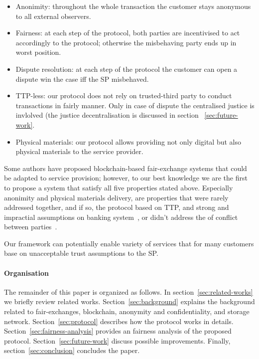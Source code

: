 \documentclass{ieeeaccess}
\begin{document}
\begin{itemize}
\item Anonimity:
throughout the whole transaction the customer stays anonymous to all external observers.
\item Fairness:
at each step of the protocol, both parties are incentivised to act accordingly to the protocol; otherwise the misbehaving party ends up in worst position.
\item Dispute resolution: at each step of the protocol the customer can open a dispute win the case iff the SP misbehaved.
\item TTP-less: 
our protocol does not rely on trusted-third party to conduct transactions in fairly manner. Only in case of dispute the centralised justice is invlolved (the justice decentralisation is discussed in section ~\ref{sec:future-work}.
\item Physical materials: our protocol allows providing not only digital but also physical materials to the service provider.
\end{itemize}

Some authors have proposed blockchain-based fair-exchange systems that could be adapted to service provision; however, to our best knowledge we
are the first to propose a system that satisfy all five properties
stated above. Especially anonimity and physical materials delivery, are
properties that were rarely addressed together, and if so, the protocol
based on TTP, and strong and impractial assumptions on banking system~\cite{birjoveanu2015anonymity}, or didn't address the of conflict
between parties~\cite{altawy2017lelantos}.

Our framework can potentially enable variety of services that for many
customers base on unacceptable trust assumptions to the SP.

\paragraph{Organisation}
The remainder of this paper is organized as follows.
In section~\ref{sec:related-works} we briefly review related works. 
Section~\ref{sec:background} explains the background related to fair-exchanges, blockchain, anonymity and confidentiality, and storage network. 
Section~\ref{sec:protocol} describes how the protocol works in details.
Section~\ref{sec:fairness-analysis} provides an fairness analysis of the proposed protocol.
Section~\ref{sec:future-work} discuss possible improvements. 
Finally, section~\ref{sec:conclusion} concludes the paper.
\end{document}
